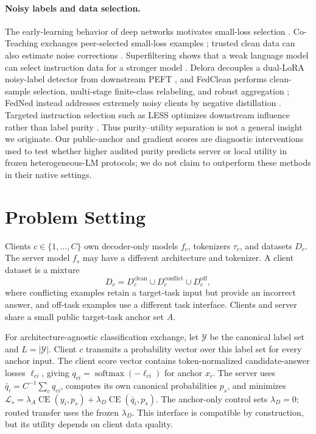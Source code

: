 \documentclass[letterpaper]{article}
\begin{document}
\paragraph{Noisy labels and data selection.}
The early-learning behavior of deep networks motivates small-loss selection
\cite{arpit2017memorization}.  Co-Teaching exchanges peer-selected small-loss
examples \cite{han2018coteaching}; trusted clean data can also estimate noise
corrections \cite{hendrycks2018trusted}.  Superfiltering shows
that a weak language model can select instruction data for a stronger model
\cite{li2024superfiltering}.  Delora decouples a dual-LoRA noisy-label detector
from downstream PEFT \cite{yuan2025delora}, and FedClean performs clean-sample
selection, multi-stage finite-class relabeling, and robust aggregation
\cite{jiang2025fedclean}; FedNed instead addresses extremely noisy clients by
negative distillation \cite{lu2024fedned}.  Targeted instruction selection such
as LESS optimizes downstream influence rather than label purity
\cite{xia2024less}.  Thus purity--utility separation is not a general insight
we originate.  Our public-anchor and gradient scores are diagnostic
interventions used to test whether higher audited purity predicts server or
local utility in frozen heterogeneous-LM protocols; we do not claim to
outperform these methods in their native settings.

\section{Problem Setting}
Clients \(c\in\{1,\ldots,C\}\) own decoder-only models \(f_c\), tokenizers
\(\tau_c\), and datasets \(D_c\).  The server model \(f_s\) may have a
different architecture and tokenizer.  A client dataset is a mixture
\[
D_c=D_c^{\mathrm{clean}}\cup D_c^{\mathrm{conflict}}
    \cup D_c^{\mathrm{off}},
\]
where conflicting examples retain a target-task input but provide an
incorrect answer, and off-task examples use a different task interface.
Clients and server share a small public target-task anchor set \(A\).

For architecture-agnostic classification exchange, let \(\mathcal Y\) be the
canonical label set and \(L=|\mathcal Y|\).  Client \(c\) transmits a
probability vector over this label set for every anchor input.  The
client score vector contains token-normalized candidate-answer losses
\(\boldsymbol\ell_{ci}\), giving
\(q_{ci}=\operatorname{softmax}(-\boldsymbol\ell_{ci})\) for anchor \(x_i\).
The server uses \(\bar q_i=C^{-1}\sum_cq_{ci}\), computes its own canonical
probabilities \(p_s\), and minimizes
\(\mathcal L_s=\lambda_A\operatorname{CE}(y_i,p_s)+
\lambda_D\operatorname{CE}(\bar q_i,p_s)\).
The anchor-only control sets \(\lambda_D=0\); routed transfer uses the frozen
\(\lambda_D\).  This interface is compatible by construction, but its utility
depends on client data quality.
\end{document}
